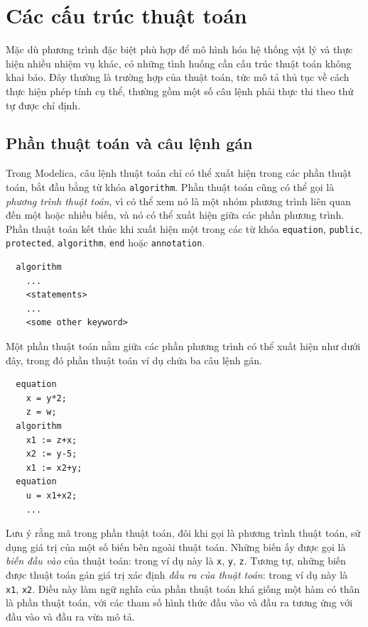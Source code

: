 \section{Các cấu trúc thuật toán}
Mặc dù phương trình đặc biệt phù hợp để mô hình hóa hệ thống vật lý và thực hiện nhiều nhiệm vụ khác, có những tình huống cần cấu trúc thuật toán không khai báo. Đây thường là trường hợp của thuật toán, tức mô tả thủ tục về cách thực hiện phép tính cụ thể, thường gồm một số câu lệnh phải thực thi theo thứ tự được chỉ định.

\subsection{Phần thuật toán và câu lệnh gán}
Trong Modelica, câu lệnh thuật toán chỉ có thể xuất hiện trong các phần thuật toán, bắt đầu bằng từ khóa \texttt{algorithm}. Phần thuật toán cũng có thể gọi là \emph{phương trình thuật toán}, vì có thể xem nó là một nhóm phương trình liên quan đến một hoặc nhiều biến, và nó có thể xuất hiện giữa các phần phương trình. Phần thuật toán kết thúc khi xuất hiện một trong các từ khóa \texttt{equation}, \texttt{public}, \texttt{protected}, \texttt{algorithm}, \texttt{end} hoặc \texttt{annotation}.
\begin{verbatim}
  algorithm
    ...
    <statements>
    ...
    <some other keyword>
\end{verbatim}
Một phần thuật toán nằm giữa các phần phương trình có thể xuất hiện như dưới đây, trong đó phần thuật toán ví dụ chứa ba câu lệnh gán.
\begin{verbatim}
  equation
    x = y*2;
    z = w;
  algorithm
    x1 := z+x;
    x2 := y-5;
    x1 := x2+y;
  equation
    u = x1+x2;
    ...
\end{verbatim}
Lưu ý rằng mã trong phần thuật toán, đôi khi gọi là phương trình thuật toán, sử dụng giá trị của một số biến bên ngoài thuật toán. Những biến ấy được gọi là \emph{biến đầu vào} của thuật toán: trong ví dụ này là \texttt{x}, \texttt{y}, \texttt{z}. Tương tự, những biến được thuật toán gán giá trị xác định \emph{đầu ra của thuật toán}: trong ví dụ này là \texttt{x1}, \texttt{x2}. Điều này làm ngữ nghĩa của phần thuật toán khá giống một hàm có thân là phần thuật toán, với các tham số hình thức đầu vào và đầu ra tương ứng với đầu vào và đầu ra vừa mô tả.

